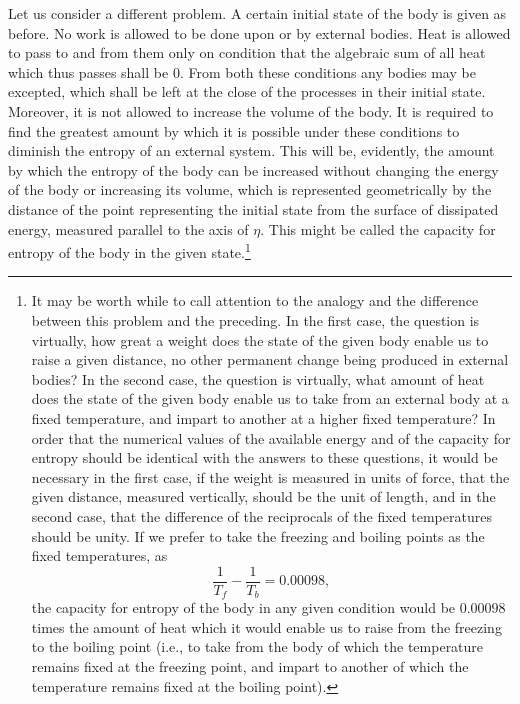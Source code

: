 \documentclass[11pt]{article}
\begin{document}
Let us consider a different problem. A certain initial state of the body is given as before. No work is allowed to be done upon or by external bodies. Heat is allowed to pass to and from them only on condition that the algebraic sum of all heat which thus passes shall be $0$. From both these conditions any bodies may be excepted, which shall be left at the close of the processes in their initial state. Moreover, it is not allowed to increase the volume of the body. It is required to find the greatest amount by which it is possible under these conditions to diminish the entropy of an external system. This will be, evidently, the amount by which the entropy of the body can be increased without changing the energy of the body or increasing its volume, which is represented geometrically by the distance of the point representing the initial state from the surface of dissipated energy, measured parallel to the axis of $\eta$. This might be called the capacity for entropy of the body in the given state.\footnote{It may be worth while to call attention to the analogy and the difference between this problem and the preceding. In the first case, the question is virtually, how great a weight does the state of the given body enable us to raise a given distance, no other permanent change being produced in external bodies? In the second case, the question is virtually, what amount of heat does the state of the given body enable us to take from an external body at a fixed temperature, and impart to another at a higher fixed temperature? In order that the numerical values of the available energy and of the capacity for entropy should be identical with the answers to these questions, it would be necessary in the first case, if the weight is measured in units of force, that the given distance, measured vertically, should be the unit of length, and in the second case, that the difference of the reciprocals of the fixed temperatures should be unity. If we prefer to take the freezing and boiling points as the fixed temperatures, as
\[
\frac{1}{T_f}-\frac{1}{T_b}=0.00098,
\]
the capacity for entropy of the body in any given condition would be $0.00098$ times the amount of heat which it would enable us to raise from the freezing to the boiling point (i.e., to take from the body of which the temperature remains fixed at the freezing point, and impart to another of which the temperature remains fixed at the boiling point).}
\end{document}
